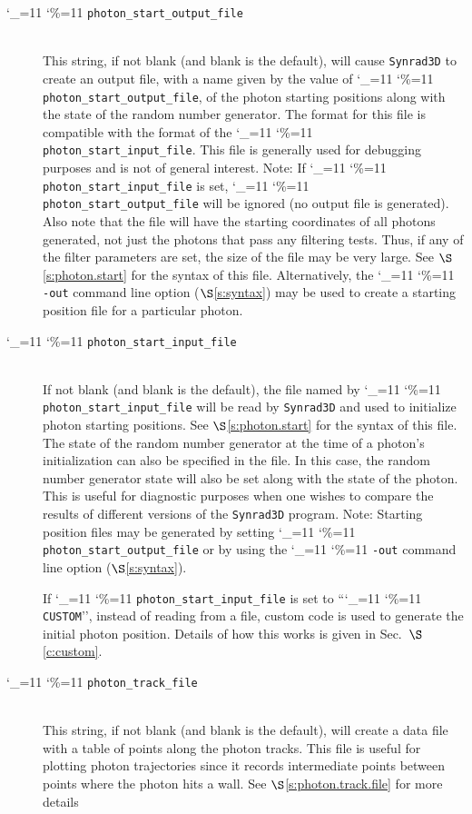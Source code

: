 \documentclass[11pt,openany]{report}
\newcommand{\sref}[1]{$\S$\ref{#1}}
\newcommand{\srthree}{\texttt{Synrad3D}\xspace}
\newcommand\ttcmd{\begingroup\catcode`\_=11 \catcode`\%=11 \dottcmd}
\newcommand\dottcmd[1]{\texttt{#1}\endgroup}
\newcommand{\vn}{\ttcmd}
\newcommand{\Newline}{\hfil \\}
\begin{document}
\begin{description}
  \item[\vn{photon_start_output_file}] \Newline
This string, if not blank (and blank is the default), will cause \srthree to create an output file,
with a name given by the value of \vn{photon_start_output_file}, of the photon starting positions
along with the state of the random number generator. The format for this file is compatible with the
format of the \vn{photon_start_input_file}. This file is generally used for debugging purposes and
is not of general interest. Note: If \vn{photon_start_input_file} is set,
\vn{photon_start_output_file} will be ignored (no output file is generated). Also note that the file
will have the starting coordinates of all photons generated, not just the photons that pass any
filtering tests. Thus, if any of the filter parameters are set, the size of the file may be very
large. See \sref{s:photon.start} for the syntax of this file. Alternatively, the \vn{-out} command
line option (\sref{s:syntax}) may be used to create a starting position file for a particular
photon.

  \item[\vn{photon_start_input_file}] \Newline
If not blank (and blank is the default), the file named by \vn{photon_start_input_file} will be read
by \srthree and used to initialize photon starting positions. See \sref{s:photon.start} for the
syntax of this file.  The state of the random number generator at the time of a photon's
initialization can also be specified in the file. In this case, the random number generator state
will also be set along with the state of the photon. This is useful for diagnostic purposes when one
wishes to compare the results of different versions of the \srthree program. Note: Starting position
files may be generated by setting \vn{photon_start_output_file} or by using the \vn{-out} command
line option (\sref{s:syntax}).

If \vn{photon_start_input_file} is set to ``\vn{CUSTOM}'', instead of reading from a file, custom
code is used to generate the initial photon position. Details of how this works is given
in Sec.~\sref{c:custom}.

  \item[\vn{photon_track_file}] \Newline
This string, if not blank (and blank is the default), will create a data file with a table of points
along the photon tracks.  This file is useful for plotting photon trajectories since it records
intermediate points between points where the photon hits a wall.  See \sref{s:photon.track.file} for
more details


\end{description}
\end{document}
